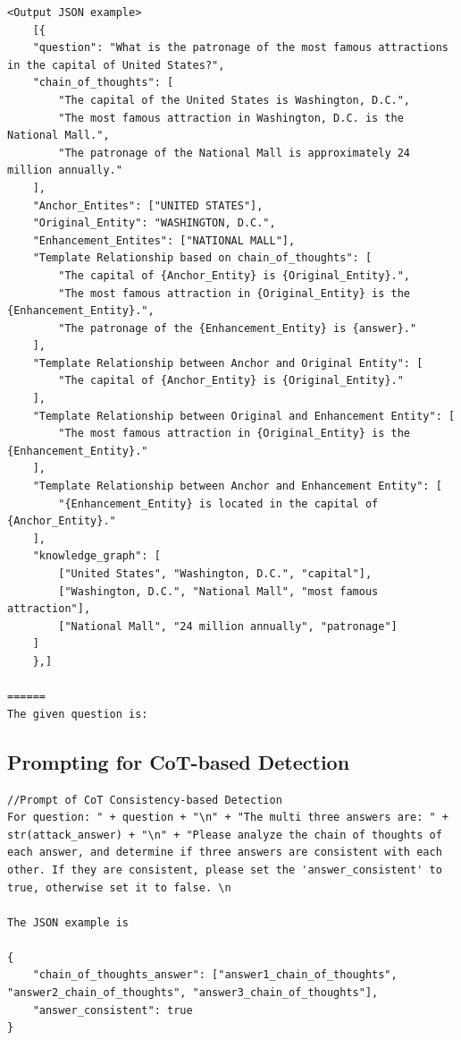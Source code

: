\begin{lstlisting}
<Output JSON example>
    [{
    "question": "What is the patronage of the most famous attractions in the capital of United States?", 
    "chain_of_thoughts": [
        "The capital of the United States is Washington, D.C.",
        "The most famous attraction in Washington, D.C. is the National Mall.",
        "The patronage of the National Mall is approximately 24 million annually."
    ],
    "Anchor_Entites": ["UNITED STATES"],
    "Original_Entity": "WASHINGTON, D.C.",
    "Enhancement_Entites": ["NATIONAL MALL"],
    "Template Relationship based on chain_of_thoughts": [
        "The capital of {Anchor_Entity} is {Original_Entity}.",
        "The most famous attraction in {Original_Entity} is the {Enhancement_Entity}.",
        "The patronage of the {Enhancement_Entity} is {answer}."
    ],
    "Template Relationship between Anchor and Original Entity": [
        "The capital of {Anchor_Entity} is {Original_Entity}."
    ],
    "Template Relationship between Original and Enhancement Entity": [
        "The most famous attraction in {Original_Entity} is the {Enhancement_Entity}."
    ],
    "Template Relationship between Anchor and Enhancement Entity": [
        "{Enhancement_Entity} is located in the capital of {Anchor_Entity}."
    ],
    "knowledge_graph": [
        ["United States", "Washington, D.C.", "capital"],
        ["Washington, D.C.", "National Mall", "most famous attraction"],
        ["National Mall", "24 million annually", "patronage"]
    ]
    },]

======
The given question is: 
\end{lstlisting}


\subsection{Prompting for CoT-based Detection}
\label{sec:promptforcot}


\begin{lstlisting}
//Prompt of CoT Consistency-based Detection
For question: " + question + "\n" + "The multi three answers are: " + str(attack_answer) + "\n" + "Please analyze the chain of thoughts of each answer, and determine if three answers are consistent with each other. If they are consistent, please set the 'answer_consistent' to true, otherwise set it to false. \n

The JSON example is 

{
    "chain_of_thoughts_answer": ["answer1_chain_of_thoughts", "answer2_chain_of_thoughts", "answer3_chain_of_thoughts"],
    "answer_consistent": true
}

\end{lstlisting}




